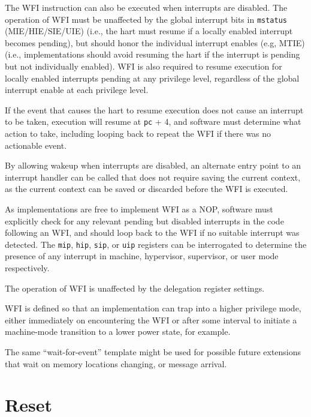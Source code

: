 The WFI instruction can also be executed when interrupts are disabled.
The operation of WFI must be unaffected by the global interrupt bits
in {\tt mstatus} (MIE/HIE/SIE/UIE) (i.e., the hart must resume if a
locally enabled interrupt becomes pending), but should honor the
individual interrupt enables (e.g, MTIE) (i.e., implementations should
avoid resuming the hart if the interrupt is pending but not
individually enabled).  WFI is also required to resume execution for
locally enabled interrupts pending at any privilege level, regardless
of the global interrupt enable at each privilege level.

If the event that causes the hart to resume execution does not cause
an interrupt to be taken, execution will resume at {\tt pc} + 4, and
software must determine what action to take, including looping back to
repeat the WFI if there was no actionable event.

\begin{commentary}
By allowing wakeup when interrupts are disabled, an alternate entry
point to an interrupt handler can be called that does not require
saving the current context, as the current context can be saved or
discarded before the WFI is executed.

As implementations are free to implement WFI as a NOP, software must
explicitly check for any relevant pending but disabled interrupts in
the code following an WFI, and should loop back to the WFI if no
suitable interrupt was detected.  The {\tt mip}, {\tt hip}, {\tt sip},
or {\tt uip} registers can be interrogated to determine the presence
of any interrupt in machine, hypervisor, supervisor, or user mode
respectively.

The operation of WFI is unaffected by the delegation register settings.

WFI is defined so that an implementation can trap into a higher
privilege mode, either immediately on encountering the WFI or after
some interval to initiate a machine-mode transition to a lower power
state, for example.
\end{commentary}

\begin{commentary}
The same ``wait-for-event'' template might be used for possible future
extensions that wait on memory locations changing, or message
arrival.
\end{commentary}

\section{Reset}
\label{sec:reset}

